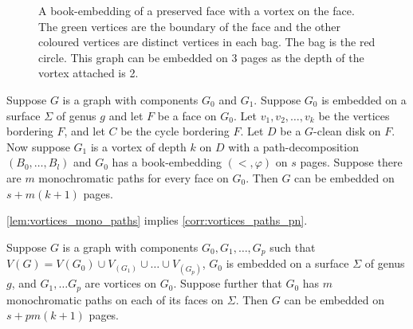 \begin{figure}[h!]
	\centering
	
	\caption[Book-embedding of a preserved face]{A book-embedding of a preserved face  with a vortex on the face. The green vertices are the boundary of the face and the other coloured vertices are distinct vertices in each bag. The bag is the red circle. This graph can be embedded on $3$ pages as the depth of the vortex attached is 2. }\label{fig:preserved_face}
\end{figure}

\begin{lemma}\label{lem:vortices_mono_paths}
	Suppose \(G\) is a graph with components \(G_0\) and \(G_1\). Suppose \(G_0\) is embedded on a surface \(\Sigma \) of genus \(g\) and let \(F\) be a face on \(G_0\). Let \(v_1, v_2, \ldots, v_k\) be the vertices bordering \(F\), and let \(C\) be the cycle bordering \(F\). Let \(D\) be a \(G\)-clean disk on \(F\). Now suppose \(G_1\) is a vortex of depth $k$ on \(D\) with a path-decomposition \((B_0, \ldots, B_l)\) and \(G_0\) has a book-embedding \((<, \varphi)\) on $s$ pages. Suppose there are \(m\) monochromatic paths for every face on $G_0$. Then \(G\) can be embedded on \(s + m(k+1)\) pages.
\end{lemma}

\cref{lem:vortices_mono_paths} implies \cref{corr:vortices_paths_pn}.

\begin{corollary}\label{corr:vortices_paths_pn}
	Suppose $G$ is a graph with components $G_0, G_1, \ldots, G_p$ such that $V(G) = V(G_0) \cup V_(G_1) \cup \ldots \cup V_(G_p)$, $G_0$ is embedded on a surface $\Sigma$ of genus $g$, and $G_1, \ldots G_p$ are vortices on $G_0$. Suppose further that $G_0$ has $m$ monochromatic paths on each of its faces on $\Sigma$. Then $G$ can be embedded on $s + pm(k+1)$ pages.
\end{corollary}

